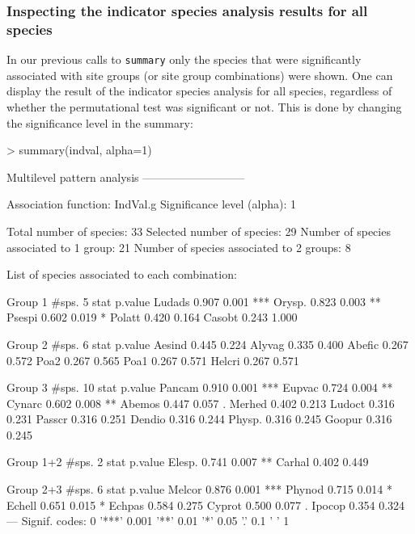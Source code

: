 \documentclass[11pt,a4paper]{article}
\begin{document}
\subsubsection{Inspecting the indicator species analysis results for all species}
In our previous calls to \texttt{summary} only the species that were significantly associated with site groups (or site group combinations) were shown. One can display the result of the indicator species analysis for all species, regardless of whether the permutational test was significant or not. This is done by changing the significance level in the summary:
\begin{Schunk}
\begin{Sinput}
> summary(indval, alpha=1)
\end{Sinput}
\begin{Soutput}
 Multilevel pattern analysis
 ---------------------------

 Association function: IndVal.g
 Significance level (alpha): 1

 Total number of species: 33
 Selected number of species: 29 
 Number of species associated to 1 group: 21 
 Number of species associated to 2 groups: 8 

 List of species associated to each combination: 

 Group 1  #sps.  5 
        stat p.value    
Ludads 0.907   0.001 ***
Orysp. 0.823   0.003 ** 
Psespi 0.602   0.019 *  
Polatt 0.420   0.164    
Casobt 0.243   1.000    

 Group 2  #sps.  6 
        stat p.value
Aesind 0.445   0.224
Alyvag 0.335   0.400
Abefic 0.267   0.572
Poa2   0.267   0.565
Poa1   0.267   0.571
Helcri 0.267   0.571

 Group 3  #sps.  10 
        stat p.value    
Pancam 0.910   0.001 ***
Eupvac 0.724   0.004 ** 
Cynarc 0.602   0.008 ** 
Abemos 0.447   0.057 .  
Merhed 0.402   0.213    
Ludoct 0.316   0.231    
Passcr 0.316   0.251    
Dendio 0.316   0.244    
Physp. 0.316   0.245    
Goopur 0.316   0.245    

 Group 1+2  #sps.  2 
        stat p.value   
Elesp. 0.741   0.007 **
Carhal 0.402   0.449   

 Group 2+3  #sps.  6 
        stat p.value    
Melcor 0.876   0.001 ***
Phynod 0.715   0.014 *  
Echell 0.651   0.015 *  
Echpas 0.584   0.275    
Cyprot 0.500   0.077 .  
Ipocop 0.354   0.324    
---
Signif. codes:  0 '***' 0.001 '**' 0.01 '*' 0.05 '.' 0.1 ' ' 1 
\end{Soutput}
\end{Schunk}
\end{document}
